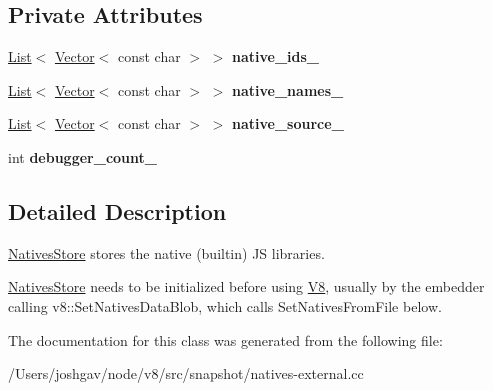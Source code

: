 \subsection*{Private Attributes}
\begin{DoxyCompactItemize}
\item 
\hyperlink{classv8_1_1internal_1_1_list}{List}$<$ \hyperlink{classv8_1_1internal_1_1_vector}{Vector}$<$ const char $>$ $>$ {\bfseries native\+\_\+ids\+\_\+}\hypertarget{classv8_1_1internal_1_1_natives_store_ac03bbc4aa7a90cdcda0281a50750aaa6}{}\label{classv8_1_1internal_1_1_natives_store_ac03bbc4aa7a90cdcda0281a50750aaa6}

\item 
\hyperlink{classv8_1_1internal_1_1_list}{List}$<$ \hyperlink{classv8_1_1internal_1_1_vector}{Vector}$<$ const char $>$ $>$ {\bfseries native\+\_\+names\+\_\+}\hypertarget{classv8_1_1internal_1_1_natives_store_a4cf71297ff8a9860292334992a235a0e}{}\label{classv8_1_1internal_1_1_natives_store_a4cf71297ff8a9860292334992a235a0e}

\item 
\hyperlink{classv8_1_1internal_1_1_list}{List}$<$ \hyperlink{classv8_1_1internal_1_1_vector}{Vector}$<$ const char $>$ $>$ {\bfseries native\+\_\+source\+\_\+}\hypertarget{classv8_1_1internal_1_1_natives_store_aaebc0345db7e16bf1982f1ca9b07985e}{}\label{classv8_1_1internal_1_1_natives_store_aaebc0345db7e16bf1982f1ca9b07985e}

\item 
int {\bfseries debugger\+\_\+count\+\_\+}\hypertarget{classv8_1_1internal_1_1_natives_store_af3ead53897a1bdc9b7e9fa4af7112ce1}{}\label{classv8_1_1internal_1_1_natives_store_af3ead53897a1bdc9b7e9fa4af7112ce1}

\end{DoxyCompactItemize}


\subsection{Detailed Description}
\hyperlink{classv8_1_1internal_1_1_natives_store}{Natives\+Store} stores the \textquotesingle{}native\textquotesingle{} (builtin) JS libraries.

\hyperlink{classv8_1_1internal_1_1_natives_store}{Natives\+Store} needs to be initialized before using \hyperlink{classv8_1_1internal_1_1_v8}{V8}, usually by the embedder calling v8\+::\+Set\+Natives\+Data\+Blob, which calls Set\+Natives\+From\+File below. 

The documentation for this class was generated from the following file\+:\begin{DoxyCompactItemize}
\item 
/\+Users/joshgav/node/v8/src/snapshot/natives-\/external.\+cc\end{DoxyCompactItemize}
